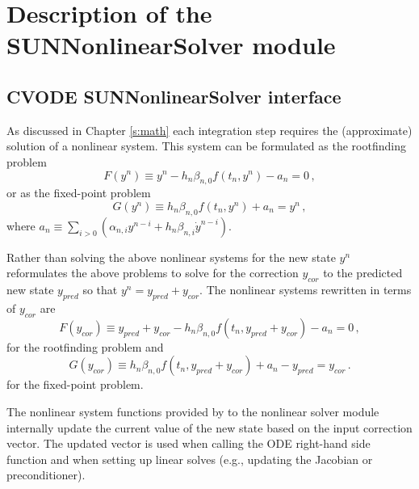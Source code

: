 \chapter{Description of the SUNNonlinearSolver module}\label{c:sunnonlinsol}


\section{CVODE SUNNonlinearSolver interface}
\label{s:sunnonlinsol_interface}

As discussed in Chapter \ref{s:math} each integration step requires the
(approximate) solution of a nonlinear system. This system can be formulated as
the rootfinding problem
\begin{equation}
  F(y^n) \equiv y^n - h_n \beta_{n,0} f(t_n,y^n) - a_n = 0 \, ,
\end{equation}
or as the fixed-point problem
\begin{equation}
  G(y^n) \equiv h_n \beta_{n,0} f(t_n,y^n) + a_n = y^n \, ,
\end{equation}
where $a_n\equiv\sum_{i>0}(\alpha_{n,i}y^{n-i}+h_n\beta_{n,i} {\dot{y}}^{n-i})$.

Rather than solving the above nonlinear systems for the new state $y^n$
{\cvode} reformulates the above problems to solve for the correction $y_{cor}$
to the predicted new state $y_{pred}$ so that $y^n = y_{pred} + y_{cor}$.
The nonlinear systems rewritten in terms of $y_{cor}$ are
\begin{equation}
  F(y_{cor}) \equiv y_{pred} + y_{cor} - h_n \beta_{n,0} f(t_n, y_{pred} + y_{cor}) - a_n = 0 \, ,
\end{equation}
for the rootfinding problem and
\begin{equation}
  G(y_{cor}) \equiv h_n \beta_{n,0} f(t_n, y_{pred} + y_{cor}) + a_n
  - y_{pred} = y_{cor} \, .
\end{equation}
for the fixed-point problem.

The nonlinear system functions provided by {\cvode} to the nonlinear solver
module internally update the current value of the new state based on the input
correction vector. The updated vector is used when calling the ODE right-hand
side function and when setting up linear solves (e.g., updating the Jacobian or
preconditioner).

